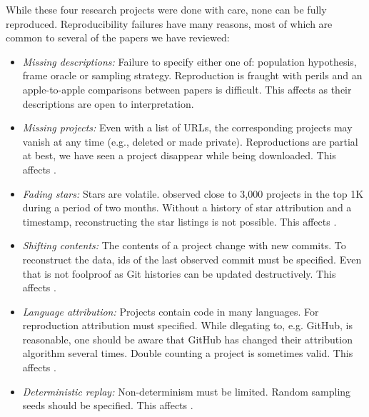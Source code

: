 \documentclass[sigconf,review,anonymous]{acmart}
\newcommand{\gh}{{GitHub}\xspace}
\begin{document}
While these four research projects were done with care, none can be fully reproduced.
Reproducibility failures have many reasons, most of which are common to several
of the papers we have reviewed:
\begin{itemize}[leftmargin=*]
\item {\it Missing descriptions:} Failure to specify either one of: population
  hypothesis, frame oracle or sampling strategy. Reproduction is fraught with
  perils and an apple-to-apple comparisons between papers is difficult. This
  affects
  \cite{Pfeiffer20,nakamaru:2020:MSR,Markovtsev:2019:MSR,Jebnoun:2020:MSR} as
  their descriptions are open to interpretation.
\item {\it Missing projects:} Even with a list of URLs, the corresponding
  projects may vanish at any time (e.g., deleted or made private). Reproductions
  are partial at best, we have seen a project disappear while being
  downloaded. This affects
  \cite{Pfeiffer20,nakamaru:2020:MSR,Markovtsev:2019:MSR,Jebnoun:2020:MSR}.
\item {\it Fading stars:} Stars are volatile. \citet{nakamaru:2020:MSR} observed
  close to 3,000 projects in the top 1K during a period of two months. Without a
  history of star attribution and a timestamp, reconstructing the star
  listings is not possible. This affects \cite{Jebnoun:2020:MSR}.
\item {\it Shifting contents:} The contents of a project change with new
  commits. To reconstruct the data, ids of the last observed commit must be
  specified. Even that is not foolproof as Git histories can be updated
  destructively. This affects
  \cite{Pfeiffer20,nakamaru:2020:MSR,Jebnoun:2020:MSR}.
\item {\it Language attribution:} Projects contain code in many languages. For
  reproduction attribution must specified. While dlegating to, e.g. \gh, is
  reasonable, one should be aware that \gh has changed their attribution
  algorithm several times. Double counting a project is sometimes valid. This
  affects \cite{Pfeiffer20, nakamaru:2020:MSR,Markovtsev:2019:MSR}.
\item {\it Deterministic replay:} Non-determinism must be limited. Random
  sampling seeds should be specified. This affects
  \cite{Markovtsev:2019:MSR}.
\end{itemize}

\noindent
\end{document}
